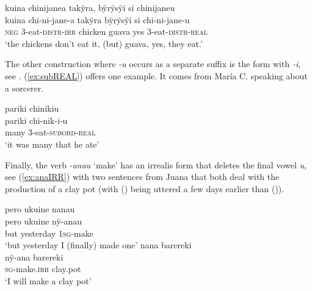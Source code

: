 \ea\label{ex:jane-real}
\begingl 
\glpreamble kuina chinijanea takÿra, bÿrÿsÿi si chinijaneu\\
\gla kuina chi-ni-jane-a takÿra bÿrÿsÿi si chi-ni-jane-u\\ 
\glb \textsc{neg} 3-eat-\textsc{distr}-\textsc{irr} chicken guava yes 3-eat-\textsc{distr}-\textsc{real}\\ 
\glft ‘the chickens don’t eat it, (but) guava, yes, they eat.’
 \trailingcitation{[rxx-e121128s-3.24]}
\xe
{}

The other construction where \textit{-u} occurs as a separate suffix is the  form with \textit{-i}, see . (\ref{ex:subREAL}) offers one example. It comes from María C. speaking about a sorcerer.

\ea\label{ex:subREAL}
\begingl 
\glpreamble pariki chinikiu\\
\gla pariki chi-nik-i-u\\ 
\glb many 3-eat-\textsc{subord}-\textsc{real}\\ 
\glft ‘it was many that he ate’
 \trailingcitation{[ump-p110815sf.597]}
\xe

Finally, the verb \textit{-anau} ‘make’ has an irrealis form that deletes the final vowel \textit{u}, see (\ref{ex:anaIRR}) with two sentences from Juana that both deal with the production of a clay pot (with () being uttered a few days earlier than ()).

\ea\label{ex:anaIRR}
  \ea\label{ex:anaIRR.1}
 \begingl 
\glpreamble pero ukuine nanau\\
\gla pero ukuine nÿ-anau\\ 
\glb but yesterday 1\textsc{sg}-make\\ 
\glft ‘but yesterday I (finally) made one’
 \trailingcitation{[jxx-d110923l-1.15]}
  \ex\label{ex:anaIRR.2}
 \begingl
\glpreamble nana barereki\\
\gla nÿ-ana barereki\\
\textsc{sg}-make.\textsc{irr} clay.pot\\
\glft ‘I will make a clay pot’
\endgl
 \trailingcitation{[jmx-d110918ls-1.022]}
\z
\xe

